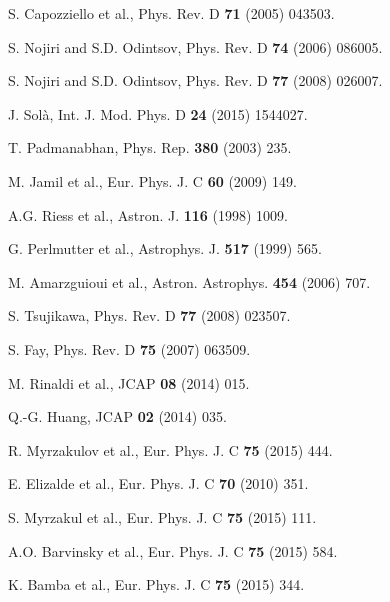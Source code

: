 \begin{thebibliography}{99}


 S. Capozziello et al., Phys. Rev. D \textbf{71}
(2005) 043503.

 S. Nojiri and S.D. Odintsov, Phys. Rev. D \textbf{74}
(2006) 086005.

 S. Nojiri and S.D. Odintsov, Phys. Rev. D \textbf{77}
(2008) 026007. 

 J. Sol\`a, Int. J. Mod. Phys. D \textbf{24} (2015)
1544027.

 T. Padmanabhan, Phys. Rep. \textbf{380} (2003)
235.

 M. Jamil et al., Eur. Phys. J. C \textbf{60} (2009) 149.

 A.G. Riess et al., Astron. J. \textbf{116} (1998) 1009.

 G. Perlmutter et al., Astrophys. J. \textbf{517}
(1999) 565.

 M. Amarzguioui et al., Astron. Astrophys. \textbf{%
454} (2006) 707.

 S. Tsujikawa, Phys. Rev. D \textbf{77} (2008)
023507.

 S. Fay, Phys. Rev. D \textbf{75} (2007) 063509. 

 M. Rinaldi et al., JCAP \textbf{08} (2014) 015.

 Q.-G. Huang, JCAP \textbf{02} (2014) 035.

 R. Myrzakulov et al., Eur. Phys. J. C \textbf{75}
(2015) 444.

 E. Elizalde et al., Eur. Phys. J. C \textbf{70}
(2010) 351.

 S. Myrzakul et al., Eur. Phys. J. C \textbf{75}
(2015) 111.

 A.O. Barvinsky et al., Eur. Phys. J. C \textbf{75}
(2015) 584.

 K. Bamba et al., Eur. Phys. J. C \textbf{75} (2015) 344.


\end{thebibliography}
